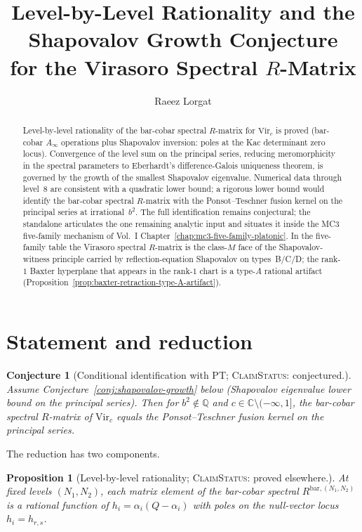 \documentclass[11pt]{amsart}
\title{Level-by-Level Rationality and the Shapovalov Growth Conjecture\\
for the Virasoro Spectral $R$-Matrix}
\author{Raeez Lorgat}
\newtheorem{proposition}[theorem]{Proposition}
\newtheorem{conjecture}[theorem]{Conjecture}
\theoremstyle{definition}
\theoremstyle{remark}
\providecommand{\Ainf}{A_\infty}
\providecommand{\ClaimStatusProvedElsewhere}{\textsc{ClaimStatus}: proved elsewhere.}
\providecommand{\ClaimStatusConjectured}{\textsc{ClaimStatus}: conjectured.}
\begin{document}
\maketitle

\begin{abstract}
Level-by-level rationality of the bar-cobar spectral $R$-matrix
for $\mathrm{Vir}_c$ is proved (bar-cobar $\Ainf$ operations plus
Shapovalov inversion: poles at the Kac determinant zero locus).
Convergence of the level sum on the principal series, reducing
meromorphicity in the spectral parameters to Eberhardt's
difference-Galois uniqueness theorem, is governed by the growth
of the smallest Shapovalov eigenvalue. Numerical data through
level~$8$ are consistent with a quadratic lower bound; a rigorous
lower bound would identify the bar-cobar spectral $R$-matrix with
the Ponsot--Teschner fusion kernel on the principal series at
irrational~$b^2$. The full identification remains conjectural; the
standalone articulates the one remaining analytic input and
situates it inside the MC3 five-family mechanism of Vol.~I
Chapter~\ref*{chap:mc3-five-family-platonic}. In the five-family
table the Virasoro spectral $R$-matrix is the class-$M$ face of the
Shapovalov-witness principle carried by reflection-equation
Shapovalov on types~B/C/D; the rank-$1$ Baxter hyperplane that
appears in the rank-$1$ chart is a type-$A$ rational artifact
(Proposition~\ref*{prop:baxter-retraction-type-A-artifact}).
\end{abstract}

\section{Statement and reduction}

\begin{conjecture}[Conditional identification with PT; \ClaimStatusConjectured]
\label{conj:rpt-conditional}
Assume Conjecture~\ref{conj:shapovalov-growth} below
(Shapovalov eigenvalue lower bound on the principal series).
Then for $b^2 \notin \mathbb{Q}$ and
$c \in \mathbb{C} \setminus (-\infty, 1]$, the bar-cobar spectral
$R$-matrix of $\mathrm{Vir}_c$ equals the Ponsot--Teschner fusion
kernel on the principal series.
\end{conjecture}

The reduction has two components.

\begin{proposition}[Level-by-level rationality; \ClaimStatusProvedElsewhere]
\label{prop:rpt-level-rationality}
At fixed levels $(N_1, N_2)$, each matrix element of the bar-cobar
spectral $R^{\mathrm{bar},(N_1,N_2)}$ is a rational function of
$h_i = \alpha_i(Q - \alpha_i)$ with poles on the null-vector locus
$h_i = h_{r,s}$.
\end{proposition}
\end{document}
